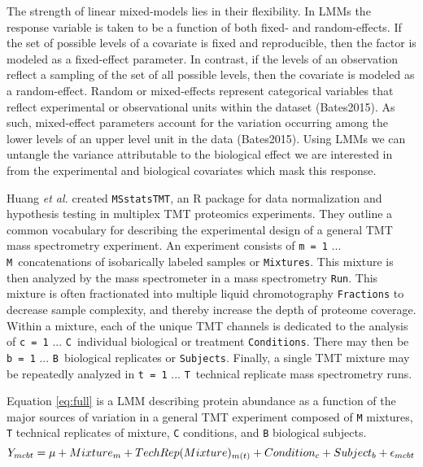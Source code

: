 \documentclass[11pt]{elife}\usepackage[]{graphicx}\usepackage[]{color}
\begin{document}
The strength of linear mixed-models lies in their flexibility. In LMMs 
the response variable is taken to be a function of both fixed- and random-effects. 
If the set of possible levels of a covariate is fixed and reproducible, then the
factor is modeled as a fixed-effect parameter.  In contrast, if the levels of an
observation reflect a sampling of the set of all possible levels, then the
covariate is modeled as a random-effect.  Random or mixed-effects represent
categorical variables that reflect experimental or observational units within
the dataset (Bates2015).  As such, mixed-effect parameters account for the
variation occurring among the lower levels of an upper level unit in the data
(Bates2015).  Using LMMs we can untangle the variance attributable to the
biological effect we are interested in from the experimental and biological
covariates which mask this response.

Huang \textit{et al.} created \texttt{MSstatsTMT}, an R package for data
normalization and hypothesis testing in multiplex TMT proteomics experiments. 
They outline a common vocabulary for describing the experimental design of 
a general TMT mass spectrometry experiment. An experiment consists of 
\texttt{m = 1} ... \texttt{M}\ concatenations of isobarically labeled samples or
\texttt{Mixtures}.  This mixture is then analyzed by the mass spectrometer in a
mass spectrometry \texttt{Run}.  This mixture is often fractionated into
multiple liquid chromotography \texttt{Fractions} to decrease sample complexity,
and thereby increase the depth of proteome coverage.  Within a mixture, each of
the unique TMT channels is dedicated to the analysis of \texttt{c = 1} ...
\texttt{C}\ individual biological or treatment \texttt{Conditions}.  There may
then be \texttt{b = 1} ... \texttt{B}\ biological replicates or
\texttt{Subjects}. Finally, a single TMT mixture may be repeatedly analyzed in
\texttt{t = 1} ... \texttt{T}\ technical replicate mass spectrometry runs.

Equation \ref{eq:full} is a LMM describing protein abundance as a function of
the major sources of variation  in a general TMT experiment composed of
\texttt{M} mixtures, \texttt{T} technical replicates of mixture, \texttt{C}
conditions, and \texttt{B} biological subjects.
\begin{equation} %
  \label{eq:full} 
	Y_{mcbt} = \mu + Mixture_m + TechRep(Mixture)_{m(t)} + Condition_c + 
	Subject_b + \epsilon_{mcbt}\\
\end{equation}
\end{document}
